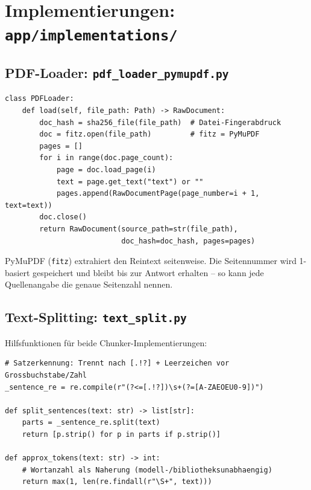\documentclass[12pt, a4paper]{article}
\begin{document}
\newpage
\section{Implementierungen: \texttt{app/implementations/}}

\subsection{PDF-Loader: \texttt{pdf\_loader\_pymupdf.py}}

\begin{lstlisting}[style=pythonstyle, caption={PDF-Loader mit PyMuPDF}]
class PDFLoader:
    def load(self, file_path: Path) -> RawDocument:
        doc_hash = sha256_file(file_path)  # Datei-Fingerabdruck
        doc = fitz.open(file_path)         # fitz = PyMuPDF
        pages = []
        for i in range(doc.page_count):
            page = doc.load_page(i)
            text = page.get_text("text") or ""
            pages.append(RawDocumentPage(page_number=i + 1, text=text))
        doc.close()
        return RawDocument(source_path=str(file_path),
                           doc_hash=doc_hash, pages=pages)
\end{lstlisting}

PyMuPDF (\texttt{fitz}) extrahiert den Reintext seitenweise. Die Seitennummer wird
1-basiert gespeichert und bleibt bis zur Antwort erhalten -- so kann jede Quellenangabe
die genaue Seitenzahl nennen.

\subsection{Text-Splitting: \texttt{text\_split.py}}

Hilfsfunktionen für beide Chunker-Implementierungen:

\begin{lstlisting}[style=pythonstyle, caption={Satztrennung und Token-Approximation}]
# Satzerkennung: Trennt nach [.!?] + Leerzeichen vor Grossbuchstabe/Zahl
_sentence_re = re.compile(r"(?<=[.!?])\s+(?=[A-ZAEOEU0-9])")

def split_sentences(text: str) -> list[str]:
    parts = _sentence_re.split(text)
    return [p.strip() for p in parts if p.strip()]

def approx_tokens(text: str) -> int:
    # Wortanzahl als Naherung (modell-/bibliotheksunabhaengig)
    return max(1, len(re.findall(r"\S+", text)))
\end{lstlisting}
\end{document}
